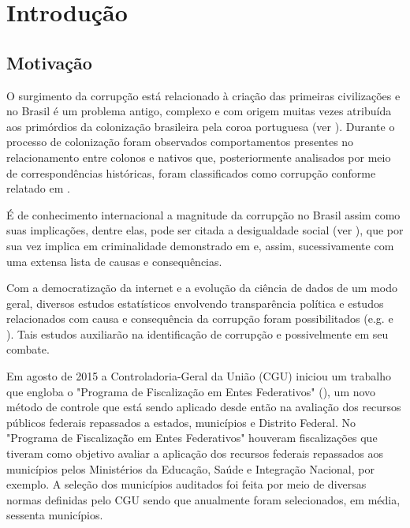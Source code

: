 \chapter{Introdução}
\label{cap:introducao}

\section{Motivação}
\label{sec:motivacao}

O surgimento da corrupção está relacionado à criação das primeiras civilizações e no Brasil é um problema antigo, complexo e com origem muitas vezes atribuída aos primórdios da colonização brasileira pela coroa portuguesa (ver \citet{LeiteMacedo2017}). Durante o processo de colonização foram observados comportamentos presentes no relacionamento entre colonos e nativos que, posteriormente analisados por meio de correspondências históricas, foram classificados como corrupção conforme relatado em \citet{LeiteMacedo2017}.

É de conhecimento internacional a magnitude da corrupção no Brasil assim como suas implicações, dentre elas, pode ser citada a desigualdade social (ver \citet{Alves2018}), que por sua vez implica em criminalidade demonstrado em \citet{ResendeAndrade2018} e, assim, sucessivamente com uma extensa lista de causas e consequências.

Com a democratização da internet e a evolução da ciência de dados de um modo geral, diversos estudos estatísticos envolvendo transparência política e estudos relacionados com causa e consequência da corrupção foram possibilitados (e.g. \citet{FerrazFinan2008} e \citet{Ransom2013:MSc}). Tais estudos auxiliarão na identificação de corrupção e possivelmente em seu combate.

Em agosto de 2015 a Controladoria-Geral da União (CGU) iniciou um trabalho que engloba o "Programa de Fiscalização em Entes Federativos" (\cite{CGU}), um novo método de controle que está sendo aplicado desde então na avaliação dos recursos públicos federais repassados a estados, municípios e Distrito Federal. No "Programa de Fiscalizaçã̃o em Entes Federativos" houveram fiscalizações que tiveram como objetivo avaliar a aplicação dos recursos federais repassados aos municípios pelos Ministérios da Educação, Saúde e Integração Nacional, por exemplo. A seleção dos municípios auditados foi feita por meio de diversas normas definidas pelo CGU sendo que anualmente foram selecionados, em média, sessenta municípios.

